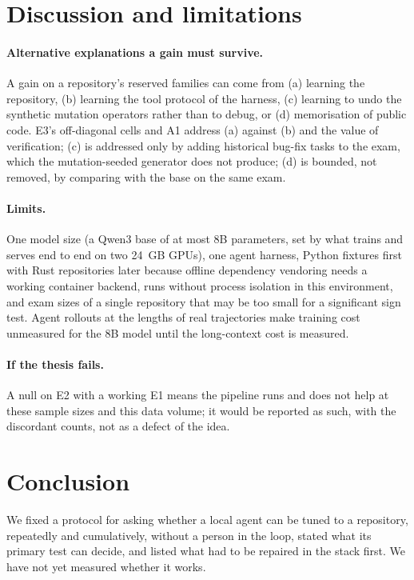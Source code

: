 
\section{Discussion and limitations}

\paragraph{Alternative explanations a gain must survive.} A gain on a repository's
reserved families can come from (a) learning the repository, (b) learning the tool
protocol of the harness, (c) learning to undo the synthetic mutation operators rather
than to debug, or (d) memorisation of public code. E3's off-diagonal cells and A1 address
(a) against (b) and the value of verification; (c) is addressed only by adding
historical bug-fix tasks to the exam, which the mutation-seeded generator does not produce;
(d) is bounded, not removed, by comparing with the base on the same exam.

\paragraph{Limits.} One model size (a Qwen3 base of at most 8B parameters, set by what
trains and serves end to end on two 24~GB GPUs), one agent harness, Python fixtures first
with Rust repositories later because offline dependency vendoring needs a working
container backend, runs without process isolation in this environment, and exam sizes of
a single repository that may be too small for a significant sign test. Agent rollouts at
the lengths of real trajectories make training cost unmeasured for the 8B model until
the long-context cost is measured.

\paragraph{If the thesis fails.} A null on E2 with a working E1 means the pipeline runs and
does not help at these sample sizes and this data volume; it would be reported as
such, with the discordant counts, not as a defect of the idea.

\section{Conclusion}

We fixed a protocol for asking whether a local agent can be tuned to a repository,
repeatedly and cumulatively, without a person in the loop, stated what its primary test can
decide, and listed what had to be repaired in the stack first. We have not yet measured
whether it works.
